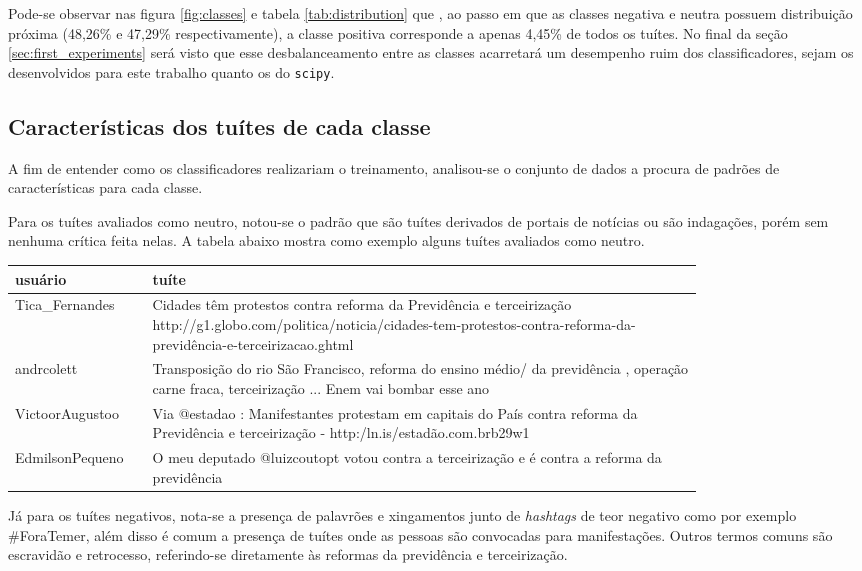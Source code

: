 Pode-se observar nas figura \ref{fig:classes} e tabela \ref{tab:distribution} 
que , ao passo em que as classes negativa e neutra possuem distribuição próxima (48,26\% e 47,29\% 
respectivamente), a classe positiva corresponde a apenas 4,45\% de todos os tuítes. No final da seção
\ref{sec:first_experiments} será visto que esse desbalanceamento entre as classes acarretará um 
desempenho ruim dos classificadores, sejam os desenvolvidos para este trabalho quanto os do
\texttt{scipy}.

\subsection{Características dos tuítes de cada classe}

A fim de entender como os classificadores realizariam o treinamento, analisou-se o conjunto de
dados a procura de padrões de características para cada classe.

Para os tuítes avaliados como neutro, notou-se o padrão que são tuítes derivados de portais de 
notícias ou são indagações, porém sem nenhuma crítica feita nelas.
A tabela abaixo mostra como exemplo alguns tuítes avaliados como neutro.

\begin{center}
	\begin{tabular}{| l | p{0.8\linewidth} |}
		\hline
		usuário & tuíte \\
		\hline
		Tica_Fernandes & Cidades têm protestos contra reforma da Previdência e terceirização http://g1.globo.com/politica/noticia/cidades-tem-protestos-contra-reforma-da-previdência-e-terceirizacao.ghtml \\
		\hline
		andrcolett & Transposição do rio São Francisco, reforma do ensino médio/ da previdência , operação carne fraca, terceirização ... Enem vai bombar esse ano \\
		\hline
		VictoorAugustoo & Via @estadao : Manifestantes protestam em capitais do País contra reforma da Previdência e terceirização - http:/ln.is/estadão.com.brb29w1 \\
		\hline
		EdmilsonPequeno & O meu deputado @luizcoutopt votou contra a terceirização e é contra a reforma da previdência \\
		\hline
	\end{tabular}
\end{center}

Já para os tuítes negativos, nota-se a presença de palavrões e xingamentos 
junto de \textit{hashtags} de teor negativo como por exemplo \#ForaTemer,
além disso é comum a presença de tuítes onde as pessoas são convocadas para manifestações.
Outros termos comuns são escravidão e retrocesso, referindo-se diretamente às reformas da previdência e terceirização.

